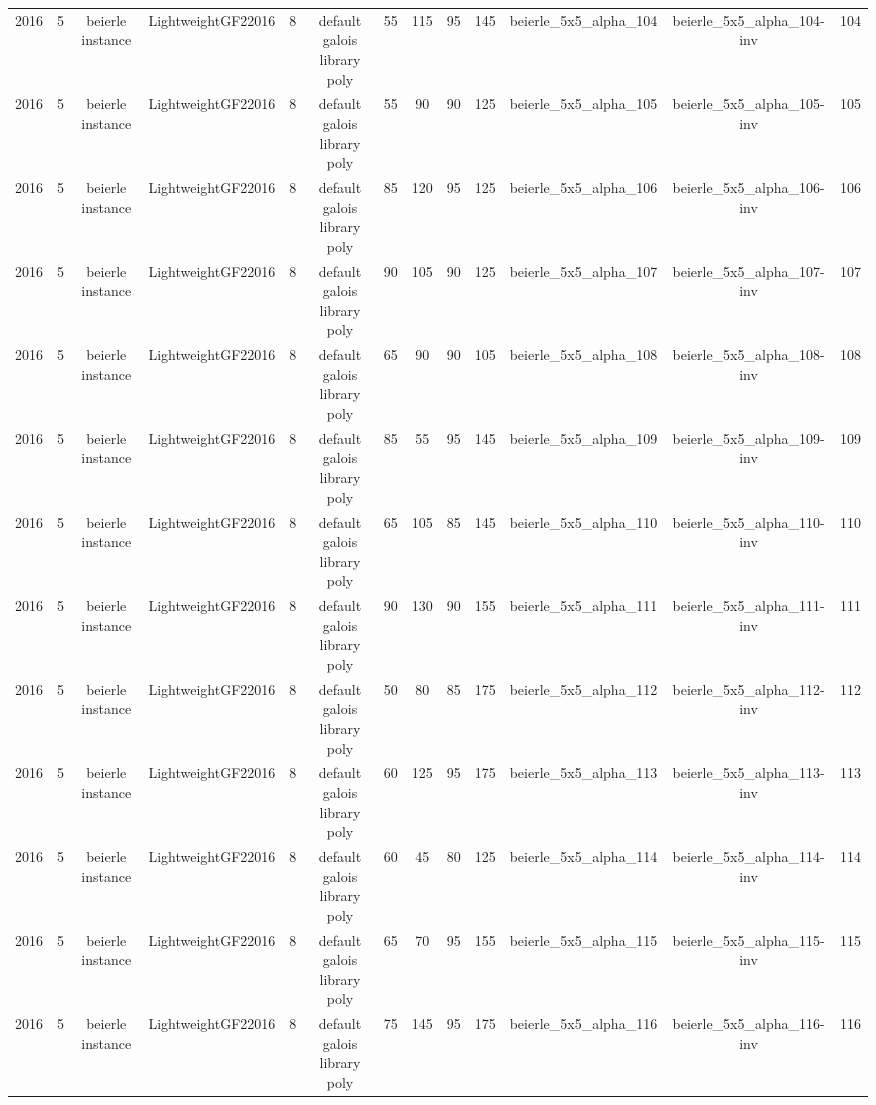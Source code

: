 \begin{tabular}{c c c c c c c c c c c c c}
2016 & 5 & beierle instance & LightweightGF22016 & 8 & default galois library poly & 55 & 115 & 95 & 145 & beierle_5x5_alpha_104 & beierle_5x5_alpha_104-inv & 104 \\
2016 & 5 & beierle instance & LightweightGF22016 & 8 & default galois library poly & 55 & 90 & 90 & 125 & beierle_5x5_alpha_105 & beierle_5x5_alpha_105-inv & 105 \\
2016 & 5 & beierle instance & LightweightGF22016 & 8 & default galois library poly & 85 & 120 & 95 & 125 & beierle_5x5_alpha_106 & beierle_5x5_alpha_106-inv & 106 \\
2016 & 5 & beierle instance & LightweightGF22016 & 8 & default galois library poly & 90 & 105 & 90 & 125 & beierle_5x5_alpha_107 & beierle_5x5_alpha_107-inv & 107 \\
2016 & 5 & beierle instance & LightweightGF22016 & 8 & default galois library poly & 65 & 90 & 90 & 105 & beierle_5x5_alpha_108 & beierle_5x5_alpha_108-inv & 108 \\
2016 & 5 & beierle instance & LightweightGF22016 & 8 & default galois library poly & 85 & 55 & 95 & 145 & beierle_5x5_alpha_109 & beierle_5x5_alpha_109-inv & 109 \\
2016 & 5 & beierle instance & LightweightGF22016 & 8 & default galois library poly & 65 & 105 & 85 & 145 & beierle_5x5_alpha_110 & beierle_5x5_alpha_110-inv & 110 \\
2016 & 5 & beierle instance & LightweightGF22016 & 8 & default galois library poly & 90 & 130 & 90 & 155 & beierle_5x5_alpha_111 & beierle_5x5_alpha_111-inv & 111 \\
2016 & 5 & beierle instance & LightweightGF22016 & 8 & default galois library poly & 50 & 80 & 85 & 175 & beierle_5x5_alpha_112 & beierle_5x5_alpha_112-inv & 112 \\
2016 & 5 & beierle instance & LightweightGF22016 & 8 & default galois library poly & 60 & 125 & 95 & 175 & beierle_5x5_alpha_113 & beierle_5x5_alpha_113-inv & 113 \\
2016 & 5 & beierle instance & LightweightGF22016 & 8 & default galois library poly & 60 & 45 & 80 & 125 & beierle_5x5_alpha_114 & beierle_5x5_alpha_114-inv & 114 \\
2016 & 5 & beierle instance & LightweightGF22016 & 8 & default galois library poly & 65 & 70 & 95 & 155 & beierle_5x5_alpha_115 & beierle_5x5_alpha_115-inv & 115 \\
2016 & 5 & beierle instance & LightweightGF22016 & 8 & default galois library poly & 75 & 145 & 95 & 175 & beierle_5x5_alpha_116 & beierle_5x5_alpha_116-inv & 116 \\

\end{tabular}
